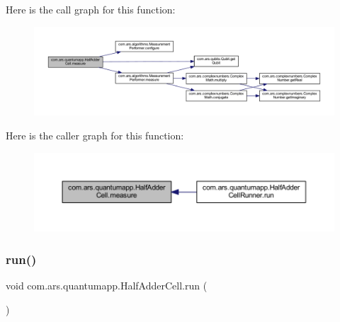 Here is the call graph for this function\+:\nopagebreak
\begin{figure}[H]
\begin{center}
\leavevmode
\includegraphics[width=350pt]{classcom_1_1ars_1_1quantumapp_1_1_half_adder_cell_a534b92e8e8fd9cbc2538a4e86311b3aa_cgraph}
\end{center}
\end{figure}
Here is the caller graph for this function\+:\nopagebreak
\begin{figure}[H]
\begin{center}
\leavevmode
\includegraphics[width=350pt]{classcom_1_1ars_1_1quantumapp_1_1_half_adder_cell_a534b92e8e8fd9cbc2538a4e86311b3aa_icgraph}
\end{center}
\end{figure}
\hypertarget{classcom_1_1ars_1_1quantumapp_1_1_half_adder_cell_a2b0fc8424cf7d70048942436a3933917}{}\label{classcom_1_1ars_1_1quantumapp_1_1_half_adder_cell_a2b0fc8424cf7d70048942436a3933917} 
\subsubsection{\texorpdfstring{run()}{run()}}
{\footnotesize\ttfamily void com.\+ars.\+quantumapp.\+Half\+Adder\+Cell.\+run (\begin{DoxyParamCaption}{ }\end{DoxyParamCaption})}

